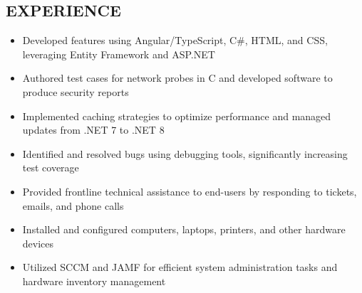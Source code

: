 \documentclass[letterpaper,11pt]{article}
\begin{document}
\begin{resume}
\section{EXPERIENCE}
\begin{itemize}
    \item Developed features using Angular/TypeScript, C\#, HTML, and CSS, leveraging Entity Framework and ASP.NET
    \item Authored test cases for network probes in C and developed software to produce security reports
    \item Implemented caching strategies to optimize performance and managed updates from .NET 7 to .NET 8
    \item Identified and resolved bugs using debugging tools, significantly increasing test coverage
\end{itemize}
\begin{itemize}
    \item Provided frontline technical assistance to end-users by responding to tickets, emails, and phone calls
    \item Installed and configured computers, laptops, printers, and other hardware devices
    \item Utilized SCCM and JAMF for efficient system administration tasks and hardware inventory management
\end{itemize}

\end{resume}
\end{document}
